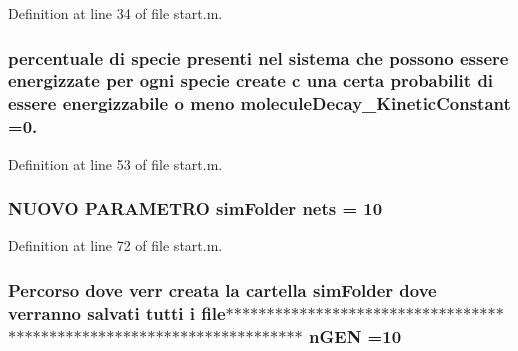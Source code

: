 Definition at line 34 of file start.\+m.

\hypertarget{a00113_a85569bbcfd8fbc0081b5a144eaf516f5}{
\subsubsection[{molecule\+Decay\+\_\+\+Kinetic\+Constant}]{\setlength{\rightskip}{0pt plus 5cm}percentuale di specie presenti nel sistema che possono essere energizzate per ogni specie create {\bf c} una certa probabilit di essere energizzabile o meno molecule\+Decay\+\_\+\+Kinetic\+Constant =0.}}\label{a00113_a85569bbcfd8fbc0081b5a144eaf516f5}


Definition at line 53 of file start.\+m.

\hypertarget{a00113_a006c95919fb4982bffba044f13cd2a7f}{
\subsubsection[{nets}]{\setlength{\rightskip}{0pt plus 5cm}N\+U\+O\+V\+O P\+A\+R\+A\+M\+E\+T\+R\+O {\bf sim\+Folder} nets = 10}}\label{a00113_a006c95919fb4982bffba044f13cd2a7f}


Definition at line 72 of file start.\+m.

\hypertarget{a00113_a4c8fe523edbe179c5d215da13f469f72}{
\subsubsection[{n\+G\+E\+N}]{\setlength{\rightskip}{0pt plus 5cm}Percorso dove verr creata la cartella {\bf sim\+Folder} dove verranno salvati tutti {\bf i} {\bf file}$\ast$$\ast$$\ast$$\ast$$\ast$$\ast$$\ast$$\ast$$\ast$$\ast$$\ast$$\ast$$\ast$$\ast$$\ast$$\ast$$\ast$$\ast$$\ast$$\ast$$\ast$$\ast$$\ast$$\ast$$\ast$$\ast$$\ast$$\ast$$\ast$$\ast$$\ast$$\ast$$\ast$$\ast$$\ast$$\ast$$\ast$$\ast$$\ast$$\ast$$\ast$$\ast$$\ast$$\ast$$\ast$$\ast$$\ast$$\ast$$\ast$$\ast$$\ast$$\ast$$\ast$$\ast$$\ast$$\ast$$\ast$$\ast$$\ast$$\ast$$\ast$$\ast$$\ast$$\ast$$\ast$$\ast$$\ast$$\ast$$\ast$$\ast$ n\+G\+E\+N =10}}\label{a00113_a4c8fe523edbe179c5d215da13f469f72}


